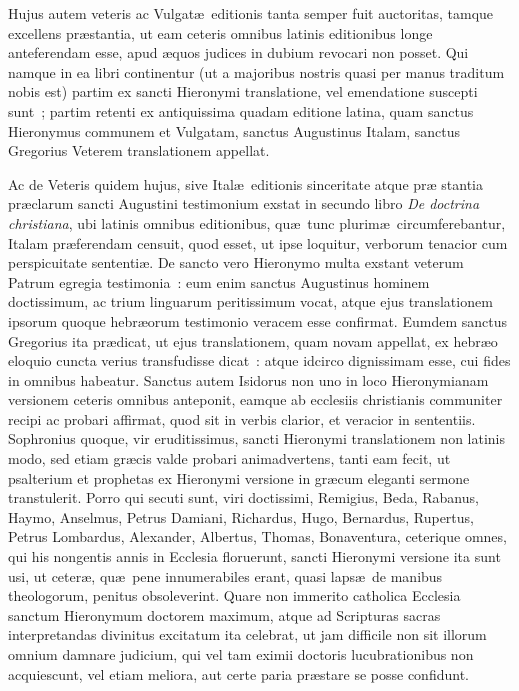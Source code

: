 Hujus autem veteris ac Vulgat\ae\ editionis tanta semper fuit auctoritas, 
tamque excellens pr\ae stantia, ut eam ceteris omnibus latinis editionibus 
longe anteferendam esse, apud \ae quos judices in dubium revocari non posset. 
Qui namque in ea libri continentur (ut a majoribus nostris quasi per manus 
traditum nobis est) partim ex sancti Hieronymi translatione, vel emendatione 
suscepti sunt~; partim retenti ex antiquissima quadam editione latina, quam 
sanctus Hieronymus communem et Vulgatam, sanctus Augustinus Italam, sanctus 
Gregorius Veterem translationem appellat.

Ac de Veteris quidem hujus, sive Ital\ae\ editionis sinceritate atque pr\ae 
stantia pr\ae clarum sancti Augustini testimonium exstat in secundo libro 
\emph{De doctrina christiana}, ubi latinis omnibus editionibus, qu\ae\ tunc plurim\ae\ 
circumferebantur, Italam pr\ae ferendam censuit, quod esset, ut ipse loquitur, 
verborum tenacior cum perspicuitate sententi\ae. De sancto vero Hieronymo 
multa exstant veterum Patrum egregia testimonia~: eum enim sanctus Augustinus 
hominem doctissimum, ac trium linguarum peritissimum vocat, atque ejus 
translationem ipsorum quoque hebr\ae orum testimonio veracem esse confirmat. 
Eumdem sanctus Gregorius ita pr\ae dicat, ut ejus translationem, quam novam 
appellat, ex hebr\ae o eloquio cuncta verius transfudisse dicat~: atque idcirco 
dignissimam esse, cui fides in omnibus habeatur. Sanctus autem Isidorus non uno 
in loco Hieronymianam versionem ceteris omnibus anteponit, eamque ab ecclesiis 
christianis communiter recipi ac probari affirmat, quod sit in verbis clarior, 
et veracior in sententiis. Sophronius quoque, vir eruditissimus, sancti 
Hieronymi translationem non latinis modo, sed etiam gr\ae cis valde probari 
animadvertens, tanti eam fecit, ut psalterium et prophetas ex Hieronymi 
versione in gr\ae cum eleganti sermone transtulerit. Porro qui secuti sunt, 
viri doctissimi, Remigius, Beda, Rabanus, Haymo, Anselmus, Petrus Damiani, 
Richardus, Hugo, Bernardus, Rupertus, Petrus Lombardus, Alexander, Albertus, 
Thomas, Bonaventura, ceterique omnes, qui his nongentis annis in Ecclesia 
floruerunt, sancti Hieronymi versione ita sunt usi, ut ceter\ae, qu\ae\ pene 
innumerabiles erant, quasi laps\ae\ de manibus theologorum, penitus 
obsoleverint. Quare non immerito catholica Ecclesia sanctum Hieronymum doctorem 
maximum, atque ad Scripturas sacras interpretandas divinitus excitatum ita 
celebrat, ut jam difficile non sit illorum omnium damnare judicium, qui vel tam 
eximii doctoris lucubrationibus non acquiescunt, vel etiam meliora, aut certe 
paria pr\ae stare se posse confidunt.

